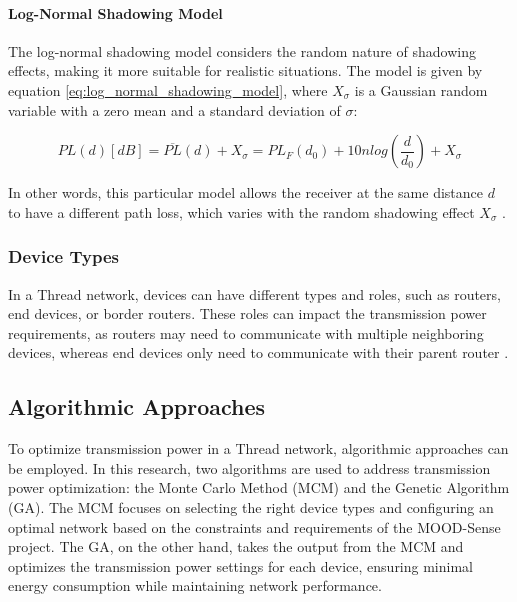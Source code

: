 \paragraph{Log-Normal Shadowing Model}

The log-normal shadowing model considers the random nature of shadowing effects, making it more suitable for realistic situations. The model is given by equation \ref{eq:log_normal_shadowing_model}, where $X_\sigma$ is a Gaussian random variable with a zero mean and a standard deviation of $\sigma$:

\begin{equation}\label{eq:log_normal_shadowing_model}
    PL\left(d\right)\left[dB\right]=\overline{PL}\left(d\right)+X_\sigma=PL_F\left(d_0\right)+10nlog\left(\frac{d}{d_0}\right)+X_\sigma
\end{equation}

In other words, this particular model allows the receiver at the same distance $d$ to have a different path loss, which varies with the random shadowing effect $X_\sigma$ \cite{cho2010mimo}.

\subsubsection{Device Types}

In a Thread network, devices can have different types and roles, such as routers, end devices, or border routers. These roles can impact the transmission power requirements, as routers may need to communicate with multiple neighboring devices, whereas end devices only need to communicate with their parent router \cite{Thread_Group_Fundamentals}.

\subsection{Algorithmic Approaches}

To optimize transmission power in a Thread network, algorithmic approaches can be employed. In this research, two algorithms are used to address transmission power optimization: the Monte Carlo Method (MCM) and the Genetic Algorithm (GA). The MCM focuses on selecting the right device types and configuring an optimal network based on the constraints and requirements of the MOOD-Sense project. The GA, on the other hand, takes the output from the MCM and optimizes the transmission power settings for each device, ensuring minimal energy consumption while maintaining network performance.

